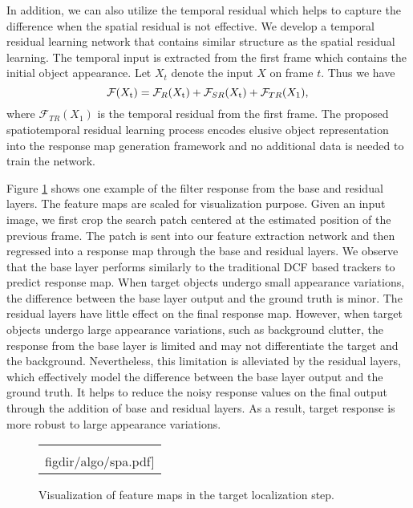 \documentclass[10pt,twocolumn,letterpaper]{article}
\newcommand{\figdir}{figures}
\newcommand{\ryn}[1]{{\color{black}{#1}}}
\begin{document}
In addition, we can also utilize the temporal residual which helps to capture the difference when the spatial residual is not effective. We develop a temporal residual learning network that contains similar structure as the spatial residual learning. The temporal input is extracted from the first frame which contains the initial object appearance. Let $X_t$ denote the input $X$ on frame $t$.
Thus we have
\begin{equation} \mathcal{F}(X_\textrm{t})=\mathcal{F}_R(X_\textrm{t})+\mathcal{F}_{SR}(X_\textrm{t})+\mathcal{F}_{TR}(X_\textrm{1}),\\
\label{eq:rest}
\end{equation}
where $\mathcal{F}_{TR}(X_\textrm{1})$ is the temporal residual from the first frame. The proposed spatiotemporal residual learning process encodes elusive object representation into the response map generation framework and no additional data is needed to train the network.

Figure \ref{fig:algo_visual} shows one example of the filter response from the base and residual layers. The feature maps are scaled for visualization purpose. Given an input image, we first crop the search patch centered at the estimated position of the previous frame. The patch is sent into our feature extraction network and then regressed into a response map through the base and residual layers. We observe that the base layer performs similarly to the traditional DCF based trackers to predict response map. When target objects undergo small appearance variations, the difference between the base layer output and the ground truth is minor. The residual layers have little effect on the final response map. However, when target objects undergo large appearance variations, such as background clutter, the response from the base layer is limited and may not differentiate the target and the background. Nevertheless, this limitation is alleviated by the residual layers, which effectively model the difference between the base layer output and the ground truth. It helps to reduce the noisy response values on the final output through the addition of base and residual layers. As a result, target response is more robust to large appearance variations.

\def\swone{1.0\linewidth}
\begin{figure}[t]
\begin{center}
\begin{tabular}{c}
\texttt{[image: \\figdir/algo/spa.pdf]}\\
\end{tabular}
\end{center}
\vspace{-5mm}
\caption{Visualization of \ryn{the} feature maps in the target localization step.}
\label{fig:algo_visual}
\vspace{-3mm}
\end{figure}
\end{document}

